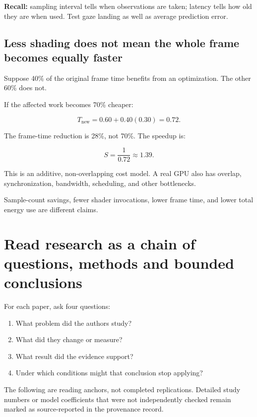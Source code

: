 \textbf{Recall:} sampling interval tells when observations are taken; latency tells how old they are when used. Test gaze landing as well as average prediction error.

\subsection{Less shading does not mean the whole frame becomes equally faster}\label{04-visual-computing-ii-ch043-less-shading-does-not-mean-the-whole-frame-becomes-equally-faster}

Suppose 40\% of the original frame time benefits from an optimization. The other 60\% does not.

If the affected work becomes 70\% cheaper:

\[
T_{\mathrm{new}}=0.60+0.40(0.30)=0.72.
\]

The frame-time reduction is 28\%, not 70\%. The speedup is:

\[
S=\frac1{0.72}\approx1.39.
\]

This is an additive, non-overlapping cost model. A real GPU also has overlap, synchronization, bandwidth, scheduling, and other bottlenecks.

Sample-count savings, fewer shader invocations, lower frame time, and lower total energy use are different claims.

\section{Read research as a chain of questions, methods and bounded conclusions}\label{04-visual-computing-ii-ch043-read-research-as-a-chain-of-questions-methods-and-bounded-conclusions}

For each paper, ask four questions:

\begin{enumerate}
\def\labelenumi{\arabic{enumi}.}
\tightlist
\item
  What problem did the authors study?
\item
  What did they change or measure?
\item
  What result did the evidence support?
\item
  Under which conditions might that conclusion stop applying?
\end{enumerate}

The following are reading anchors, not completed replications. Detailed study numbers or model coefficients that were not independently checked remain marked as source-reported in the provenance record.

